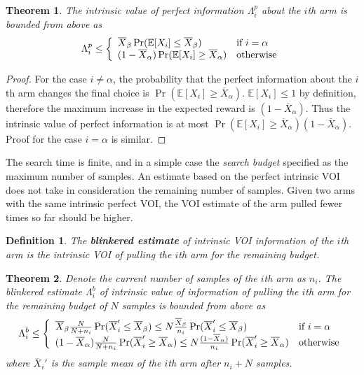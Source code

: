 \documentclass{article}
\newcommand {\IE} {\ensuremath {\mathbb{E}}}
\newtheorem{dfn}{Definition}
\newtheorem{thm}{Theorem}
\begin{document}
\begin{thm} The intrinsic value of perfect information $\Lambda_i^p$ about the $i$th arm is
  bounded from above as
\begin{equation}
  \Lambda_i^p \le \left\{
  \begin{array}{l l}
    \overline X_\beta \Pr(\IE[X_i] \le \overline X_\beta) & \mbox{{\rm if} $i=\alpha$} \\
    (1-\overline X_\alpha)\Pr(\IE[X_i] \ge \overline X_\alpha) & \mbox{\rm otherwise}
  \end{array} \right.
\label{eqn:thm-vopi}
\end{equation}
\label{thm:vopi}
\end{thm}

\begin{proof} For the case $i\ne \alpha$, the probability that the perfect
  information about the $i$th arm changes the final choice is
  $\Pr(\IE[X_i] \ge \overline X_\alpha)$. $\IE[X_i] \le 1$ by definition,
  therefore the maximum increase in the expected reward is
  $(1-\overline X_\alpha)$. Thus the intrinsic value of perfect
  information is at most $\Pr(\IE[X_i] \ge \overline
  X_\alpha)(1-\overline X_\alpha)$.
  Proof for the case $i=\alpha$ is similar.
\end{proof}

The search time is finite, and in a simple case the \textit{search
  budget} specified as the maximum number of samples.
An estimate based on the perfect intrinsic VOI does not take in
consideration the remaining number of samples. Given two arms
with the same intrinsic perfect VOI, the VOI
estimate of the arm pulled fewer times so far should be higher.

\begin{dfn} The \textbf{blinkered estimate} of intrinsic VOI information of the
  $i$th arm is the intrinsic VOI of pulling the $i$th arm for the
  remaining budget.
\end{dfn}

\begin{thm} Denote the current number of samples of the $i$th arm as
  $n_i$. The blinkered estimate $\Lambda_i^b$ of intrinsic value of
  information of pulling the $i$th arm for the remaining budget of $N$
  samples is bounded from above as
\begin{equation}
  \Lambda_i^b \le \left\{
  \begin{array}{l l}
    \overline X_\beta\frac N {N+n_i}\Pr(\overline X_i'\le\overline X_\beta)
    \le N\frac {\overline X_\beta} {n_i}\Pr(\overline X_i'\le\overline X_\beta) & \mbox{{\rm if} $i=\alpha$} \\
    (1-\overline  X_\alpha)\frac N {N+n_i}\Pr(\overline X_i'\ge\overline X_\alpha)
       \le N\frac {(1-\overline  X_\alpha)} {n_i}\Pr(\overline X_i'\ge\overline X_\alpha) & \mbox{\rm otherwise}
  \end{array} \right.
\label{eqn:thm-be}
\end{equation}
where $\overline X_i'$ is the sample mean of the $i$th arm after $n_i+N$ 
samples.
\label{thm:be}
\end{thm}
\end{document}
